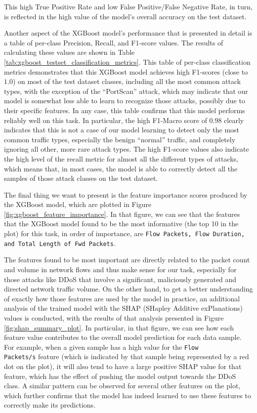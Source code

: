 This high True Positive Rate and low False Positive/False Negative Rate, in turn, is reflected in the high value of the model’s overall accuracy on the test dataset.

Another aspect of the XGBoost model’s performance that is presented in detail is a table of per-class Precision, Recall, and F1-score values. The results of calculating these values are shown in Table \ref{tab:xgboost_testset_classification_metrics}. This table of per-class classification metrics demonstrates that this XGBoost model achieves high F1-scores (close to $1.0$) on most of the test dataset classes, including all the most common attack types, with the exception of the “PortScan” attack, which may indicate that our model is somewhat less able to learn to recognize those attacks, possibly due to their specific features. In any case, this table confirms that this model performs reliably well on this task. In particular, the high F1-Macro score of $0.98$ clearly indicates that this is not a case of our model learning to detect only the most common traffic types, especially the benign “normal” traffic, and completely ignoring all other, more rare attack types. The high F1-score values also indicate the high level of the recall metric for almost all the different types of attacks, which means that, in most cases, the model is able to correctly detect all the samples of those attack classes on the test dataset.

The final thing we want to present is the feature importance scores produced by the XGBoost model, which are plotted in Figure \ref{fig:xgboost_feature_importance}. In that figure, we can see that the features that the XGBoost model found to be the most informative (the top 10 in the plot) for this task, in order of importance, are \texttt{Flow Packets, Flow Duration, and Total Length of Fwd Packets}.

The features found to be most important are directly related to the packet count and volume in network flows and thus make sense for our task, especially for those attacks like DDoS that involve a significant, maliciously generated and directed network traffic volume. On the other hand, to get a better understanding of exactly how those features are used by the model in practice, an additional analysis of the trained model with the SHAP (SHapley Additive exPlanations) values is conducted, with the results of that analysis presented in Figure \ref{fig:shap_summary_plot}. In particular, in that figure, we can see how each feature value contributes to the overall model prediction for each data sample. For example, when a given sample has a high value for the \texttt{Flow\\ Packets/s} feature (which is indicated by that sample being represented by a red dot on the plot), it will also tend to have a large positive SHAP value for that feature, which has the effect of pushing the model output towards the DDoS class. A similar pattern can be observed for several other features on the plot, which further confirms that the model has indeed learned to use these features to correctly make its predictions.


